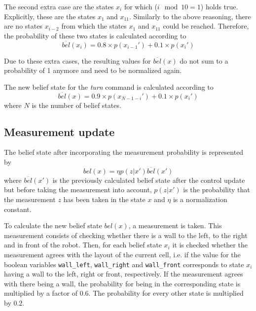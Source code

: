 \documentclass[10pt,a4paper]{article}
\begin{document}
		The second extra case are the states $x_i$ for which ($i \mod{10}=1$) holds true. Explicitly, these are the states $x_1$ and $x_{11}$. Similarly to the above reasoning, there are no states $x_{i-2}$ from which the states $x_1$ and $x_{11}$ could be reached. Therefore, the probability of these two states is calculated according to		
		\begin{displaymath}
			\overline{bel}(x_i) = 0.8\times p(x_{i-1}') + 0.1\times p(x_i')
		\end{displaymath}
		
		Due to these extra cases, the resulting values for $\overline{bel}(x)$ do not sum to a probability of 1 anymore and need to be normalized again.
		
		The new belief state for the \textit{turn} command is calculated according to		
		\begin{displaymath}
			\overline{bel}(x) = 0.9\times p(x_{N-1-i}') + 0.1\times p(x_i')
		\end{displaymath}
		where $N$ is the number of belief states.
		
		\subsection{Measurement update}
		The belief state after incorporating the measurement probability is represented by
		\begin{displaymath}
			bel(x)=\eta p(z|x')\overline{bel}(x')
		\end{displaymath}
		where $\overline{bel}(x')$ is the previously calculated belief state after the control update but before taking the measurement into account, $p(z|x')$ is the probability that the measurement $z$ has been taken in the state $x$ and $\eta$ is a normalization constant.
		
		To calculate the new belief state $bel(x)$, a measurement is taken. This measurement consists of checking whether there is a wall to the left, to the right and in front of the robot. Then, for each belief state $x_i$ it is checked whether the measurement agrees with the layout of the current cell, i.e. if the value for the boolean variables \verb|wall_left|, \verb|wall_right| and \verb|wall_front| corresponds to state $x_i$ having a wall to the left, right or front, respectively. If the measurement agrees with there being a wall, the probability for being in the corresponding state is multiplied by a factor of $0.6$. The probability for every other state is multiplied by $0.2$.
		
\end{document}

